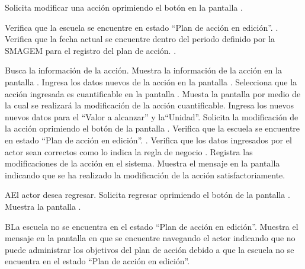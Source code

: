  
\begin{UCtrayectoria}
	\UCpaso[\UCactor] Solicita modificar una acción oprimiendo el botón \botEdit en la pantalla . 

	\UCpaso[\UCsist] Verifica que la escuela se encuentre en  estado ``Plan de acción en edición''. .
    \UCpaso[\UCsist] Verifica que la fecha actual se encuentre dentro del periodo definido por la SMAGEM para el registro del plan de acción. .
	
	\UCpaso[\UCsist] Busca la información de la acción.
	\UCpaso[\UCsist] Muestra la información de la acción en la pantalla .
	\UCpaso[\UCactor] Ingresa los datos nuevos de la acción en la pantalla .\label{cup9:ingresaDatos} 
	\UCpaso[\UCactor] Selecciona que la acción ingresada es cuantificable en la pantalla .  \label{cup9:selecciona}
	\UCpaso[\UCsist] Muesta la pantalla  por medio de la cual se realizará la modificación de la acción cuantificable.
	\UCpaso[\UCactor] Ingresa los nuevos nuevos datos para el  ``Valor a alcanzar''  y la``Unidad''.
	\UCpaso[\UCactor] Solicita la modificación de la acción oprimiendo el botón  de la pantalla .  \label{cup9:solicita}
	\UCpaso[\UCsist] Verifica que la escuela se encuentre en  estado ``Plan de acción en edición''. .	
	\UCpaso[\UCsist] Verifica que los datos ingresados por el actor sean correctos como lo indica la regla de negocio .   
	\UCpaso[\UCsist] Registra las modificaciones de la acción en el sistema. 
	\UCpaso[\UCsist] Muestra el mensaje  en la pantalla  indicando que se ha realizado la modificación de la acción satisfactoriamente.
\end{UCtrayectoria}

\begin{UCtrayectoriaA}{A}{El actor desea regresar.}
	\UCpaso[\UCactor] Solicita regresar oprimiendo el botón  de la pantalla .
	\UCpaso[\UCsist] Muestra la pantalla  .
\end{UCtrayectoriaA} 

\begin{UCtrayectoriaA}{B}{La escuela no se encuentra en el estado ``Plan de acción en edición''.}
    \UCpaso[\UCsist] Muestra el mensaje  en la pantalla en que se encuentre navegando el actor indicando que no puede administrar los objetivos del plan de acción debido a que la escuela no se encuentra en el estado ``Plan de acción en edición''. 
 \end{UCtrayectoriaA}
 
